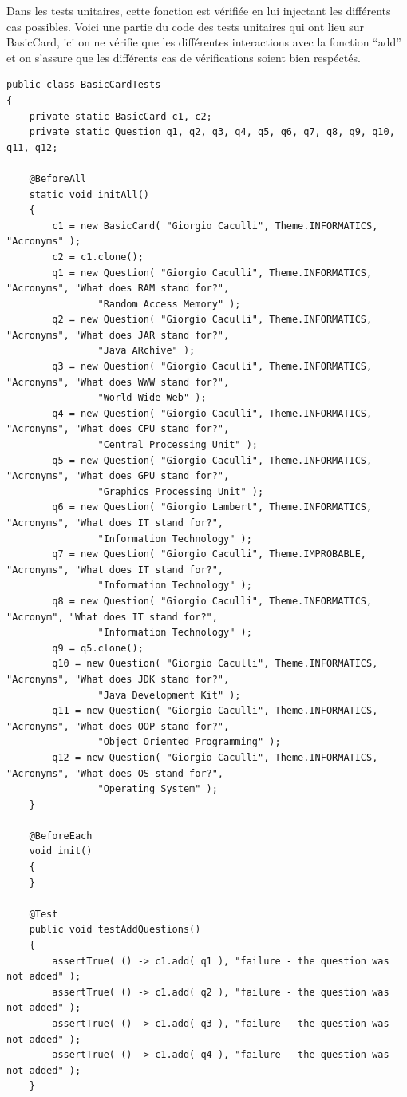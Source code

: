 Dans les tests unitaires, cette fonction est vérifiée en lui injectant les différents cas possibles.
Voici une partie du code des tests unitaires qui ont lieu sur BasicCard, ici on ne vérifie que les différentes interactions avec la fonction ``add'' et on s'assure que les différents cas de vérifications soient bien respéctés.

\begin{lstlisting}
public class BasicCardTests
{
    private static BasicCard c1, c2;
    private static Question q1, q2, q3, q4, q5, q6, q7, q8, q9, q10, q11, q12;

    @BeforeAll
    static void initAll()
    {
        c1 = new BasicCard( "Giorgio Caculli", Theme.INFORMATICS, "Acronyms" );
        c2 = c1.clone();
        q1 = new Question( "Giorgio Caculli", Theme.INFORMATICS, "Acronyms", "What does RAM stand for?",
                "Random Access Memory" );
        q2 = new Question( "Giorgio Caculli", Theme.INFORMATICS, "Acronyms", "What does JAR stand for?",
                "Java ARchive" );
        q3 = new Question( "Giorgio Caculli", Theme.INFORMATICS, "Acronyms", "What does WWW stand for?",
                "World Wide Web" );
        q4 = new Question( "Giorgio Caculli", Theme.INFORMATICS, "Acronyms", "What does CPU stand for?",
                "Central Processing Unit" );
        q5 = new Question( "Giorgio Caculli", Theme.INFORMATICS, "Acronyms", "What does GPU stand for?",
                "Graphics Processing Unit" );
        q6 = new Question( "Giorgio Lambert", Theme.INFORMATICS, "Acronyms", "What does IT stand for?",
                "Information Technology" );
        q7 = new Question( "Giorgio Caculli", Theme.IMPROBABLE, "Acronyms", "What does IT stand for?",
                "Information Technology" );
        q8 = new Question( "Giorgio Caculli", Theme.INFORMATICS, "Acronym", "What does IT stand for?",
                "Information Technology" );
        q9 = q5.clone();
        q10 = new Question( "Giorgio Caculli", Theme.INFORMATICS, "Acronyms", "What does JDK stand for?",
                "Java Development Kit" );
        q11 = new Question( "Giorgio Caculli", Theme.INFORMATICS, "Acronyms", "What does OOP stand for?",
                "Object Oriented Programming" );
        q12 = new Question( "Giorgio Caculli", Theme.INFORMATICS, "Acronyms", "What does OS stand for?",
                "Operating System" );
    }

    @BeforeEach
    void init()
    {
    }

    @Test
    public void testAddQuestions()
    {
        assertTrue( () -> c1.add( q1 ), "failure - the question was not added" );
        assertTrue( () -> c1.add( q2 ), "failure - the question was not added" );
        assertTrue( () -> c1.add( q3 ), "failure - the question was not added" );
        assertTrue( () -> c1.add( q4 ), "failure - the question was not added" );
    }


\end{lstlisting}
